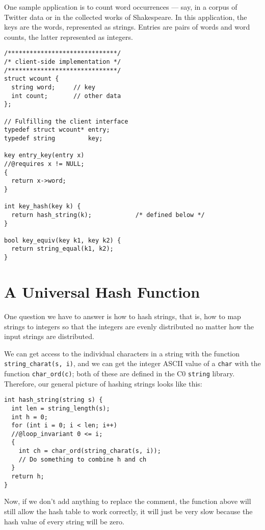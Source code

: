 One sample application is to count word occurrences --- say, in a
corpus of Twitter data or in the collected works of Shakespeare.  In
this application, the keys are the words, represented as strings.
Entries are pairs of words and word counts, the latter represented as
integers.

\begin{lstlisting}[language={[C0]C}]
/******************************/
/* client-side implementation */
/******************************/
struct wcount {
  string word;     // key
  int count;       // other data
};

// Fulfilling the client interface
typedef struct wcount* entry;
typedef string         key;

key entry_key(entry x)
//@requires x != NULL;
{
  return x->word;
}

int key_hash(key k) {
  return hash_string(k);            /* defined below */
}

bool key_equiv(key k1, key k2) {
  return string_equal(k1, k2);
}
\end{lstlisting}


\section{A Universal Hash Function}
\label{sec:hdict:string_hashing}

One question we have to answer is how to hash strings, that is,
how to map strings to integers so that the integers are evenly
distributed no matter how the input strings are distributed.

We can get access to the individual characters in a string with the function
\lstinline'string_charat(s, i)', and we can get the integer ASCII value of a
\lstinline'char' with the function \lstinline'char_ord(c)'; both of these are
defined in the C0 \lstinline'string' library. Therefore, our general picture
of hashing strings looks like this:
\begin{lstlisting}[language={[C0]C}]
int hash_string(string s) {
  int len = string_length(s);
  int h = 0;
  for (int i = 0; i < len; i++)
  //@loop_invariant 0 <= i;
  {
    int ch = char_ord(string_charat(s, i));
    // Do something to combine h and ch
  }
  return h;
}
\end{lstlisting}
Now, if we don't add anything to replace the comment, the function
above will still allow the hash table to work correctly, it will just
be very slow because the hash value of every string will be zero.

